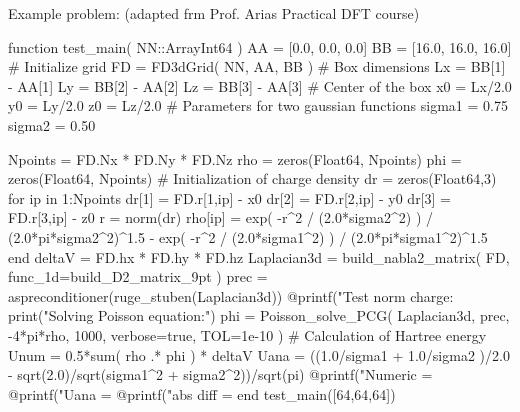 Example problem: (adapted frm Prof. Arias Practical DFT course)
\begin{juliacode}
function test_main( NN::Array{Int64} )
    AA = [0.0, 0.0, 0.0]
    BB = [16.0, 16.0, 16.0]
    # Initialize grid
    FD = FD3dGrid( NN, AA, BB )
    # Box dimensions
    Lx = BB[1] - AA[1]
    Ly = BB[2] - AA[2]
    Lz = BB[3] - AA[3]
    # Center of the box
    x0 = Lx/2.0
    y0 = Ly/2.0
    z0 = Lz/2.0
    # Parameters for two gaussian functions
    sigma1 = 0.75 
    sigma2 = 0.50

    Npoints = FD.Nx * FD.Ny * FD.Nz
    rho = zeros(Float64, Npoints)
    phi = zeros(Float64, Npoints)
    # Initialization of charge density
    dr = zeros(Float64,3)
    for ip in 1:Npoints
        dr[1] = FD.r[1,ip] - x0
        dr[2] = FD.r[2,ip] - y0
        dr[3] = FD.r[3,ip] - z0
        r = norm(dr)
        rho[ip] = exp( -r^2 / (2.0*sigma2^2) ) / (2.0*pi*sigma2^2)^1.5 -
                  exp( -r^2 / (2.0*sigma1^2) ) / (2.0*pi*sigma1^2)^1.5
    end
    deltaV = FD.hx * FD.hy * FD.hz
    Laplacian3d = build_nabla2_matrix( FD, func_1d=build_D2_matrix_9pt )
    prec = aspreconditioner(ruge_stuben(Laplacian3d))
    @printf("Test norm charge: %
    print("Solving Poisson equation:\n")
    phi = Poisson_solve_PCG( Laplacian3d, prec, -4*pi*rho, 1000, verbose=true, TOL=1e-10 )
    # Calculation of Hartree energy
    Unum = 0.5*sum( rho .* phi ) * deltaV
    Uana = ((1.0/sigma1 + 1.0/sigma2 )/2.0 - sqrt(2.0)/sqrt(sigma1^2 + sigma2^2))/sqrt(pi)
    @printf("Numeric  = %
    @printf("Uana     = %
    @printf("abs diff = %
end
test_main([64,64,64])
\end{juliacode}